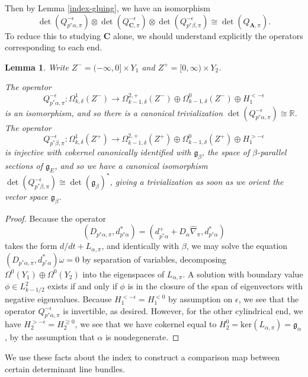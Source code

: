 \documentclass{memo-l}
\newtheorem{lemma}[theorem]{Lemma}
\theoremstyle{definition}
\theoremstyle{remark}
\numberwithin{section}{chapter}
\numberwithin{equation}{chapter}
\begin{document}
Then by Lemma \ref{index-gluing}, we have an isomorphism $$\det(Q_{p^*\alpha,\pi}^{-\epsilon}) \otimes \det(Q_{\mathbf{C},\pi}^{-\epsilon}) \otimes \det(Q_{p^*\beta,\pi}^{-\epsilon}) \cong \det(Q_{\mathbf{A},\pi}).$$ To reduce this to studying $\mathbf{C}$ alone, we should understand explicitly the operators corresponding to each end.

\begin{lemma}Write $Z^- = (-\infty, 0] \times Y_1$ and $Z^+ = [0, \infty) \times Y_2$.

The operator $$Q_{p^*\alpha, \pi}^{-\epsilon}: \Omega^1_{k,\delta}(Z^-) \to \Omega^{2,+}_{k-1,\delta}(Z^-) \oplus \Omega^0_{k-1,\delta}(Z^-) \oplus H_1^{< -\epsilon}$$ is an isomorphism, and so there is a canonical trivialization $\det(Q_{p^*\alpha, \pi}^{-\epsilon}) \cong \mathbb R$. The operator $$Q_{p^*\beta, \pi}^{-\epsilon}: \Omega^1_{k,\delta}(Z^+) \to \Omega^{2,+}_{k-1,\delta}(Z^+) \oplus \Omega^0_{k-1,\delta}(Z^+) \oplus H_1^{> -\epsilon}$$ is injective with cokernel canonically identified with $\mathfrak g_\beta$, the space of $\beta$-parallel sections of $\mathfrak g_E$, and so we have a canonical isomorphism $\det(Q_{p^*\beta, \pi}^{-\epsilon}) \cong \det(\mathfrak g_\beta)^*$, giving a trivialization as soon as we orient the vector space $\mathfrak g_\beta$.
\end{lemma}
\begin{proof}Because the operator $$(D_{p^*\alpha, \pi}, d^*_{p^*\alpha}) = (d^+_{p^*\alpha} + D_\alpha \widehat{\nabla}_\pi, d^*_{p^*\alpha})$$ takes the form $d/dt + L_{\alpha, \pi}$, and identically with $\beta$, we may solve the equation $(D_{p^*\alpha, \pi}, d^*_{p^*\alpha})\omega = 0$ by separation of variables, decomposing $\Omega^0(Y_1) \oplus \Omega^0(Y_2)$ into the eigenspaces of $L_{\alpha,\pi}$. A solution with boundary value $\phi \in L^2_{k-1/2}$ exists if and only if $\phi$ is in the closure of the span of eigenvectors with negative eigenvalues. Because $H_1^{< -\epsilon} = H_1^{< 0}$ by assumption on $\epsilon$, we see that the operator $Q_{p^*\alpha, \pi}^{-\epsilon}$ is invertible, as desired. However, for the other cylindrical end, we have $H_2^{> -\epsilon} = H_2^{\geq 0}$, we see that we have cokernel equal to $H_2^0 = \text{ker}(L_{\alpha,\pi}) = \mathfrak g_\alpha$, by the assumption that $\alpha$ is nondegenerate.
\end{proof}

We use these facts about the index to construct a comparison map between certain determinant line bundles.
\end{document}
